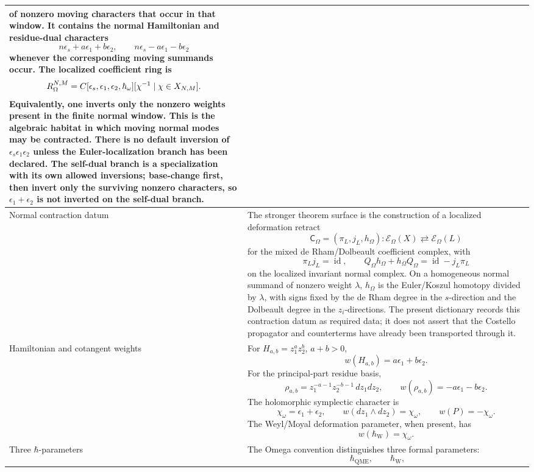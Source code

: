 \begin{longtable}{@{}>{\raggedright\arraybackslash}p{}
  >{\raggedright\arraybackslash}p{}@{}}
of nonzero moving characters that occur in that window.  It contains the
normal Hamiltonian and residue-dual characters
\[
  n\epsilon_s+a\epsilon_1+b\epsilon_2,\qquad
  n\epsilon_s-a\epsilon_1-b\epsilon_2
\]
whenever the corresponding moving summands occur.  The localized
coefficient ring is
\[
  R_\Omega^{N,M}
  =
  C[\epsilon_s,\epsilon_1,\epsilon_2,\hbar_\omega]
  [\chi^{-1}\mid \chi\in X_{N,M}].
\]
Equivalently, one inverts only the nonzero weights present in the finite
normal window.  This is the algebraic habitat in which moving normal
modes may be contracted.  There is no default inversion of
\(\epsilon_s\epsilon_1\epsilon_2\) unless the Euler-localization branch
has been declared.  The self-dual branch is a specialization with its own
allowed inversions; base-change first, then invert only the surviving
nonzero characters, so \(\epsilon_1+\epsilon_2\) is not inverted on the
self-dual branch.\\
\hline
Normal contraction datum &
The stronger theorem surface is the construction of a localized
deformation retract
\[
  \mathsf C_\Omega=(\pi_L,j_L,h_\Omega)
  \colon
  \mathcal E_\Omega(X)
  \rightleftarrows
  \mathcal E_\Omega(L)
\]
for the mixed de Rham/Dolbeault coefficient complex, with
\[
  \pi_Lj_L=\operatorname{id},
  \qquad
  Q_\Omega h_\Omega+h_\Omega Q_\Omega
  =\operatorname{id}-j_L\pi_L
\]
on the localized invariant normal complex.  On a homogeneous normal
summand of nonzero weight \(\lambda\), \(h_\Omega\) is the Euler/Koszul
homotopy divided by \(\lambda\), with signs fixed by the de Rham degree
in the \(s\)-direction and the Dolbeault degree in the \(z_i\)-directions.
The present dictionary records this contraction datum as required data;
it does not assert that the Costello propagator and counterterms have
already been transported through it.\\
\hline
Hamiltonian and cotangent weights &
For \(H_{a,b}=z_1^az_2^b\), \(a+b>0\),
\[
  w(H_{a,b})=a\epsilon_1+b\epsilon_2.
\]
For the principal-part residue basis,
\[
  \rho_{a,b}=z_1^{-a-1}z_2^{-b-1}\,dz_1dz_2,
  \qquad
  w(\rho_{a,b})=-a\epsilon_1-b\epsilon_2 .
\]
The holomorphic symplectic character is
\[
  \chi_\omega=\epsilon_1+\epsilon_2,
  \qquad
  w(dz_1\wedge dz_2)=\chi_\omega,
  \qquad
  w(P)=-\chi_\omega .
\]
The Weyl/Moyal deformation parameter, when present, has
\[
  w(\hbar_{\mathrm{W}})=\chi_\omega.
\]\\
\hline
Three \(\hbar\)-parameters &
The Omega convention distinguishes three formal parameters:
\[
  \hbar_{\mathrm{QME}},\qquad
  \hbar_{\mathrm{W}},\qquad
\]
\end{longtable}
